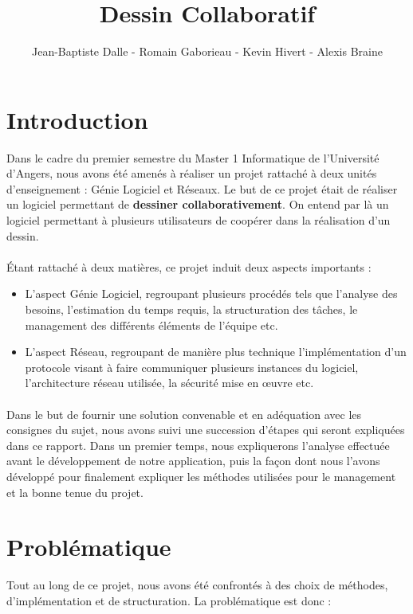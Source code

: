 \documentclass[a4paper,11pt]{article}
\title{Dessin Collaboratif}
\author{Jean-Baptiste Dalle - Romain Gaborieau - Kevin Hivert - Alexis Braine}
\date{}
\begin{document}
\maketitle

\clearpage

\tableofcontents

\clearpage

\section*{Introduction}
Dans le cadre du premier semestre du Master 1 Informatique de l'Université d'Angers, nous avons été amenés à réaliser un projet rattaché à deux unités d'enseignement : Génie Logiciel et Réseaux. Le but de ce projet était de réaliser un logiciel permettant de \textbf{dessiner collaborativement}. On entend par là un logiciel permettant à plusieurs utilisateurs de coopérer dans la réalisation d'un dessin.

\paragraph{} Étant rattaché à deux matières, ce projet induit deux aspects importants :

\begin{itemize}
	\item L'aspect Génie Logiciel, regroupant plusieurs procédés tels que l'analyse des besoins, l'estimation du temps requis, la structuration des tâches, le management des différents éléments de l'équipe etc.
	\item L'aspect Réseau, regroupant de manière plus technique l'implémentation d'un protocole visant à faire communiquer plusieurs instances du logiciel, l'architecture réseau utilisée, la sécurité mise en œuvre etc.
\end{itemize}

\paragraph{} Dans le but de fournir une solution convenable et en adéquation avec les consignes du sujet, nous avons suivi une succession d'étapes qui seront expliquées dans ce rapport. Dans un premier temps, nous expliquerons l'analyse effectuée avant le développement de notre application, puis la façon dont nous l'avons développé pour finalement expliquer les méthodes utilisées pour le management et la bonne tenue du projet.


\section*{Problématique}
Tout au long de ce projet, nous avons été confrontés à des choix de méthodes, d'implémentation et de structuration. La problématique est donc :
\end{document}
